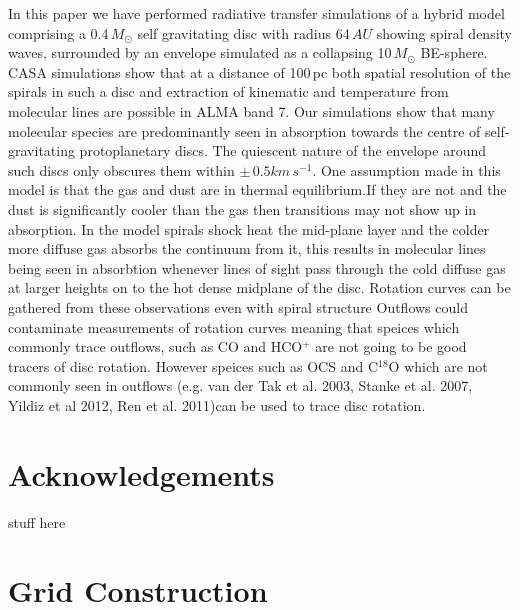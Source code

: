 \documentclass[useAMS,usenatbib]{mn2e}
\begin{document}
In this paper we have performed radiative transfer simulations of a hybrid model comprising a 0.4$\, M_\odot$ self gravitating disc with radius 64$\,AU$ showing spiral density waves, surrounded by an envelope simulated as a collapsing 10$\,M_\odot$ BE-sphere. CASA simulations show that at a distance of 100$\,$pc both spatial resolution of the spirals in such a disc and extraction of kinematic and temperature from molecular lines are possible in ALMA band 7. Our simulations show that many  molecular species are predominantly seen in absorption towards the centre of  self-gravitating protoplanetary discs. The quiescent nature of the envelope around such discs only obscures them within $\pm\,0.5 km\,s^{-1}$.\newline
One assumption made in this model is that the gas and dust are in thermal equilibrium.If they are not and the dust is significantly cooler than the gas then transitions may not show up in absorption.\newline
In the model spirals shock heat the mid-plane layer and the colder more diffuse gas absorbs the continuum from it, this results in molecular lines being seen in absorbtion whenever lines of sight pass through the cold diffuse gas at larger heights on to the hot dense midplane of the disc. Rotation curves can be gathered from these observations even with spiral structure\newline
Outflows could contaminate measurements of rotation curves meaning that speices  which commonly trace outflows, such as CO and HCO$^+$ are not going to be good tracers of disc rotation. However speices such as OCS and C$^{18}$O which are not commonly seen in outflows (e.g. van der Tak et al. 2003, Stanke et al. 2007, Yildiz et al 2012, Ren et al. 2011)can be used to trace disc rotation.


\section*{Acknowledgements}

stuff here
\newpage

\appendix

\section{Grid Construction} \label{sec:gridding} 
\end{document}
